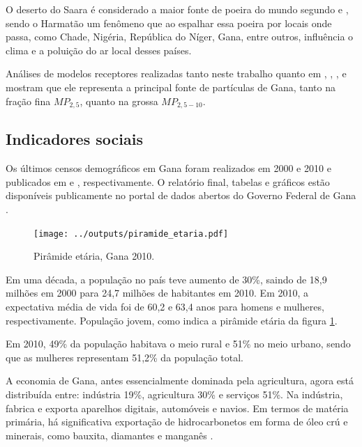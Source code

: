 O deserto do Saara é considerado a maior fonte de poeira do mundo segundo 
\citet{breuning2005} e \citet{prospero2002}, sendo o Harmatão um fenômeno que 
ao espalhar essa poeira por locais onde passa, como Chade, Nigéria, 
República do Níger, Gana, entre outros, influência o clima e a poluição do ar 
local desses países.

Análises de modelos receptores 
realizadas tanto neste trabalho quanto em \citet{aboh2009}, \citet{dionisio2010b}, 
\citet{zhou2011}, \citet{ofosu2012} e \citet{rooney2012} mostram que ele 
representa a principal 
fonte de partículas de Gana, tanto na fração fina $MP_{2,5}$, quanto na grossa 
$MP_{2,5-10}$.

\subsection{Indicadores sociais}

Os últimos censos demográficos em Gana foram realizados em 2000 e 2010 
e publicados em \citeyear{ghanacensus2003} e \citeyear{ghanacensus2013}, 
respectivamente. O relatório final, tabelas e gráficos estão disponíveis
publicamente no portal de dados abertos do Governo Federal de Gana 
\citep{opendataghana}.

\begin{figure}
  \centering
  \texttt{[image: ../outputs/piramide\_etaria.pdf]}
  \caption{Pirâmide etária, Gana 2010. \citep{ghanacensus2013} 
           \label{fig:piramedegana}}
\end{figure}

Em uma década, a população no país teve aumento de 30\%, saindo de 18,9 milhões em 
2000 para 24,7 milhões de habitantes em 2010. Em 2010, a expectativa média de 
vida foi de 60,2 e 63,4 anos para homens e mulheres, respectivamente.
População jovem, como indica a pirâmide etária da figura \ref{fig:piramedegana}.

Em 2010, 49\% da população habitava o meio rural e 51\% no meio urbano, 
sendo que as mulheres representam 51,2\% da população total.

A economia de Gana, antes essencialmente dominada pela agricultura, 
agora está distribuída entre: indústria 19\%, agricultura 30\% 
e serviços 51\%. Na indústria, fabrica e exporta aparelhos digitais, 
automóveis e navios. Em termos de matéria primária, há significativa 
exportação de hidrocarbonetos em forma de óleo crú e minerais,
como bauxita, diamantes e manganês \citep{ghanacensus2013}.
  
